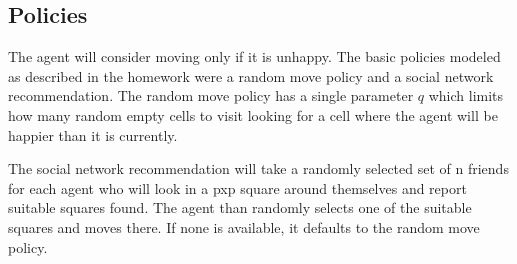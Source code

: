 \documentclass[12pt]{article}
\begin{document}
\subsection{Policies}\label{subsec:policies}
The agent will consider moving only if it is unhappy. The basic policies modeled as described in the homework were a random move policy and a social network recommendation. The random move policy has a single parameter $q$ which limits how many random empty cells to visit looking for a cell where the agent will be happier than it is currently. 

The social network recommendation will take a randomly selected set of n friends for each agent who will look in a pxp square around themselves and report suitable squares found. The agent than randomly selects one of the suitable squares and moves there. If none is available, it defaults to the random move policy. 
\end{document}
